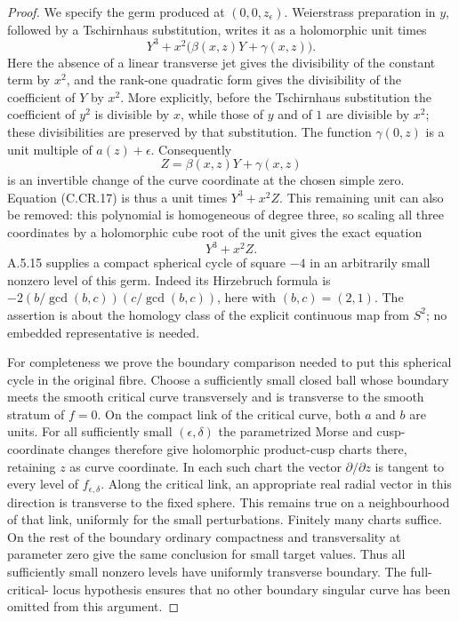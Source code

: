 \begin{proof}
We specify the germ produced at
$(0,0,z_\epsilon)$. Weierstrass preparation in $y$,
followed by a Tschirnhaus substitution, writes it as
a holomorphic unit times
\[
             Y^3+x^2\bigl(\beta(x,z)Y+\gamma(x,z)\bigr).
 \tag{C.CR.17}
\]
Here the absence of a linear transverse jet gives
the divisibility of the constant term by $x^2$,
and the rank-one quadratic form gives the divisibility
of the coefficient of $Y$ by $x^2$. More explicitly,
before the Tschirnhaus substitution the coefficient
of $y^2$ is divisible by $x$, while those of $y$
and of $1$ are divisible by $x^2$; these divisibilities
are preserved by that substitution.
The function $\gamma(0,z)$ is a unit multiple of
$a(z)+\epsilon$. Consequently
\[
             Z=\beta(x,z)Y+\gamma(x,z)
\]
is an invertible change of the curve coordinate at
the chosen simple zero. Equation (C.CR.17) is thus
a unit times $Y^3+x^2Z$. This remaining unit can
also be removed: this polynomial is homogeneous
of degree three, so scaling all three coordinates
by a holomorphic cube root of the unit gives the
exact equation
\[
                            Y^3+x^2Z.
 \tag{C.CR.18}
\]
A.5.15 supplies a compact spherical cycle of square $-4$
in an arbitrarily small nonzero level of this germ.
Indeed its Hirzebruch formula is
$-2(b/\gcd(b,c))(c/\gcd(b,c))$, here with
$(b,c)=(2,1)$. The assertion is about the homology
class of the explicit continuous map from $S^2$;
no embedded representative is needed.

For completeness we prove the boundary comparison
needed to put this spherical cycle in the original fibre.
Choose a sufficiently small closed ball whose
boundary meets the smooth critical curve transversely
and is transverse to the smooth stratum of $f=0$.
On the compact link of the critical curve, both
$a$ and $b$ are units. For all sufficiently small
$(\epsilon,\delta)$ the parametrized Morse and
cusp-coordinate changes therefore give holomorphic
product-cusp charts there, retaining $z$ as curve
coordinate. In each such chart the vector
$\partial/\partial z$ is tangent to every level
of $f_{\epsilon,\delta}$. Along the critical link,
an appropriate real radial vector in this direction
is transverse to the fixed sphere. This remains
true on a neighbourhood of that link, uniformly
for the small perturbations. Finitely many charts
suffice. On the rest of the boundary ordinary
compactness and transversality at parameter zero
give the same conclusion for small target values.
Thus all sufficiently small nonzero levels have
uniformly transverse boundary. The full-critical-
locus hypothesis ensures that no other boundary
singular curve has been omitted from this argument.


\end{proof}
